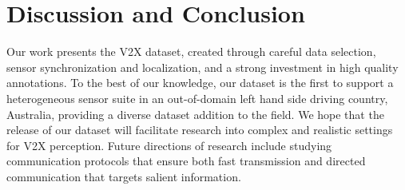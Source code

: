 \section{Discussion and Conclusion}

Our work presents the \ours{} V2X dataset, created through careful data selection, sensor synchronization and localization, and a strong investment in high quality annotations. 
To the best of our knowledge, our dataset is the first to support a heterogeneous sensor suite in an out-of-domain left hand side driving country, Australia, providing a diverse dataset addition to the field.
We hope that the release of our dataset will facilitate research into 
complex and realistic settings for V2X perception.
Future directions of research include studying communication protocols that ensure both fast transmission 
and directed communication that targets salient information.

